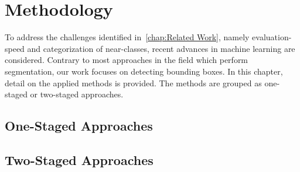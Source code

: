 \chapter{Methodology}\label{chap:Methodology}
To address the challenges identified in~\autoref{chap:Related Work}, namely 
evaluation-speed and categorization of near-classes, recent advances in machine 
learning are considered. Contrary to most approaches in the field which perform 
segmentation, our work focuses on detecting bounding boxes. In this chapter, 
detail on the applied methods is provided.
The methods are grouped as one-staged or two-staged approaches.

% 
% 

\section{One-Staged Approaches}
\blindtext[6]

\section{Two-Staged Approaches}
\blindtext[6]